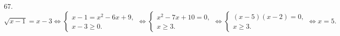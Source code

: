 67. $\sqrt{x-1}=x-3\Leftrightarrow\begin{cases}x-1=x^2-6x+9,\\x-3\geqslant0.\end{cases}\Leftrightarrow\begin{cases}x^2-7x+10=0,\\x\geqslant3.\end{cases}
\Leftrightarrow\begin{cases}(x-5)(x-2)=0,\\x\geqslant3.\end{cases}\Leftrightarrow x=5.$\\
